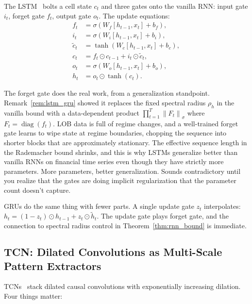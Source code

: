 \documentclass[11pt]{article}
\theoremstyle{definition}
\theoremstyle{remark}
\DeclareMathOperator{\diag}{diag}
\newcommand{\norm}[1]{\left\lVert #1 \right\rVert}
\begin{document}
The LSTM~\citep{hochreiter1997long} bolts a cell state $c_t$ and three gates onto the vanilla RNN: input gate $i_t$, forget gate $f_t$, output gate $o_t$.
The update equations:
\begin{align}
    f_t &= \sigma(W_f [h_{t-1}, x_t] + b_f), \\
    i_t &= \sigma(W_i [h_{t-1}, x_t] + b_i), \\
    \tilde{c}_t &= \tanh(W_c [h_{t-1}, x_t] + b_c), \\
    c_t &= f_t \odot c_{t-1} + i_t \odot \tilde{c}_t, \\
    o_t &= \sigma(W_o [h_{t-1}, x_t] + b_o), \\
    h_t &= o_t \odot \tanh(c_t).
\end{align}

The forget gate does the real work, from a generalization standpoint.
Remark~\ref{rem:lstm_gru} showed it replaces the fixed spectral radius $\rho_h$ in the vanilla bound with a data-dependent product $\prod_{t=1}^T \norm{F_t}_\sigma$ where $F_t = \diag(f_t)$.
LOB data is full of regime changes, and a well-trained forget gate learns to wipe state at regime boundaries, chopping the sequence into shorter blocks that are approximately stationary.
The effective sequence length in the Rademacher bound shrinks, and this is why LSTMs generalize better than vanilla RNNs on financial time series even though they have strictly more parameters.
More parameters, better generalization.
Sounds contradictory until you realize that the gates are doing implicit regularization that the parameter count doesn't capture.

GRUs do the same thing with fewer parts.
A single update gate $z_t$ interpolates: $h_t = (1 - z_t) \odot h_{t-1} + z_t \odot \tilde{h}_t$.
The update gate plays forget gate, and the connection to spectral radius control in Theorem~\ref{thm:rnn_bound} is immediate.

\subsection{TCN: Dilated Convolutions as Multi-Scale Pattern Extractors}\label{sec:arch:tcn}

TCNs~\citep{bai2018empirical} stack dilated causal convolutions with exponentially increasing dilation.
Four things matter:
\end{document}
